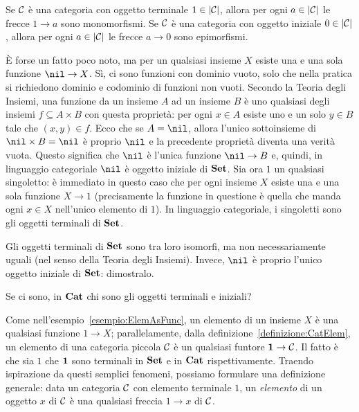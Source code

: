 \begin{esercizio}
Se \(\mathcal C\) è una categoria con oggetto terminale \(1 \in \lvert\mathcal C\rvert\), allora per ogni \(a \in \lvert\mathcal C\rvert\) le frecce \(1 \to a\) sono monomorfismi. Se \(\mathcal C\) è una categoria con oggetto iniziale \(0 \in \lvert\mathcal C\rvert\), allora per ogni \(a \in \lvert\mathcal C\rvert\) le frecce \(a \to 0\) sono epimorfismi.
\end{esercizio}

\begin{esempio}
È forse un fatto poco noto, ma per un qualsiasi insieme \(X\) esiste una e una sola funzione \(\nil \to X\). Sì, ci sono funzioni con dominio vuoto, solo che nella pratica si richiedono dominio e codominio di funzioni non vuoti. Secondo la Teoria degli Insiemi, una funzione da un insieme \(A\) ad un insieme \(B\) è uno qualsiasi degli insiemi \(f \subseteq A \times B\) con questa proprietà: per ogni \(x \in A\) esiste uno e un solo \(y \in B\) tale che \((x, y) \in f\). Ecco che se \(A = \nil\), allora l'unico sottoinsieme di \(\nil \times B = \nil\) è proprio \(\nil\) e la precedente proprietà diventa una verità vuota. Questo significa che \(\nil\) è l'unica funzione \(\nil \to B\) e, quindi, in linguaggio categoriale \(\nil\) è oggetto iniziale di \(\mathbf{Set}\).\newline
Sia ora \(1\) un qualsiasi singoletto: è immediato in questo caso che per ogni insieme \(X\) esiste una e una sola funzione \(X \to 1\) (precisamente la funzione in questione è quella che manda ogni \(x \in X\) nell'unico elemento di \(1\)). In linguaggio categoriale, i singoletti sono gli oggetti terminali di \(\mathbf{Set}\).
\end{esempio}

\begin{esercizio}
Gli oggetti terminali di \(\mathbf{Set}\) sono tra loro isomorfi, ma non necessariamente uguali (nel senso della Teoria degli Insiemi). Invece, \(\nil\) è proprio l'unico oggetto iniziale di \(\mathbf{Set}\): dimostralo.
\end{esercizio}

\begin{esercizio}
Se ci sono, in \(\mathbf{Cat}\) chi sono gli oggetti terminali e iniziali?
\end{esercizio}

\begin{costruzione}
Come nell'esempio~\ref{esempio:ElemAsFunc}, un elemento di un insieme \(X\) è una qualsiasi funzione \(1 \to X\); parallelamente, dalla definizione~\ref{definizione:CatElem}, un elemento di una categoria piccola \(\mathcal C\) è un qualsiasi funtore \(\mathbf{1} \to \mathcal C\). Il fatto è che sia \(1\) che \(\mathbf{1}\) sono terminali in \(\mathbf{Set}\) e in \(\mathbf{Cat}\) rispettivamente. Traendo ispirazione da questi semplici fenomeni, possiamo formulare una definizione generale: data un categoria \(\mathcal C\) con elemento terminale \(1\), un {\em elemento} di un oggetto \(x\) di \(\mathcal C\) è una qualsiasi freccia \(1 \to x\) di \(\mathcal C\).
\end{costruzione}

